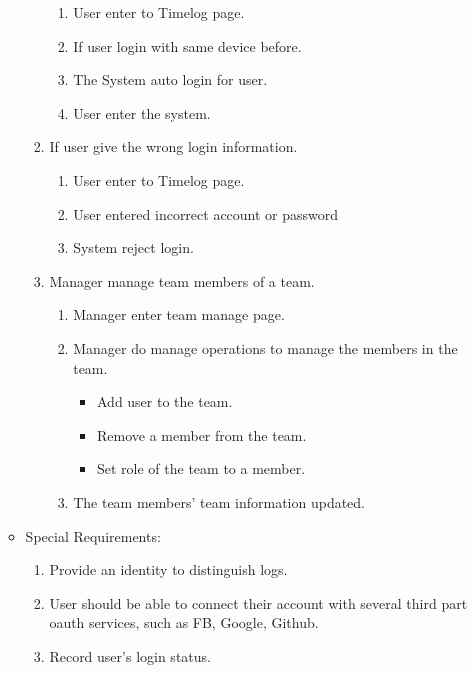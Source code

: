 \documentclass[12pt, a4paper]{article}
\begin{document}
\begin{CJK*}{UTF8}{bkai}
\begin{enumerate}
\begin{itemize}
\begin{enumerate}
                \begin{enumerate}
                  \item User enter to Timelog page.
                  \item If user login with same device before.
                  \item The System auto login for user.
                  \item User enter the system.
                \end{enumerate}
              \item If user give the wrong login information.
                \begin{enumerate}
                  \item User enter to Timelog page.
                  \item User entered incorrect account or password
                  \item System reject login.
                \end{enumerate}
              \item Manager manage team members of a team.
                \begin{enumerate}
                  \item Manager enter team manage page.
                  \item Manager do manage operations to manage the members in the team.
                    \begin{itemize}
                      \item Add user to the team.
                      \item Remove a member from the team.
                      \item Set role of the team to a member.
                    \end{itemize}
                  \item The team members' team information updated.
                \end{enumerate}
            \end{enumerate}
          \item Special Requirements:
            \begin{enumerate}
              \item Provide an identity to distinguish logs.
              \item User should be able to connect their account with several third part oauth services, such as FB, Google, Github.
              \item Record user's login status.

\end{enumerate}
\end{itemize}
\end{enumerate}
\end{CJK*}
\end{document}

